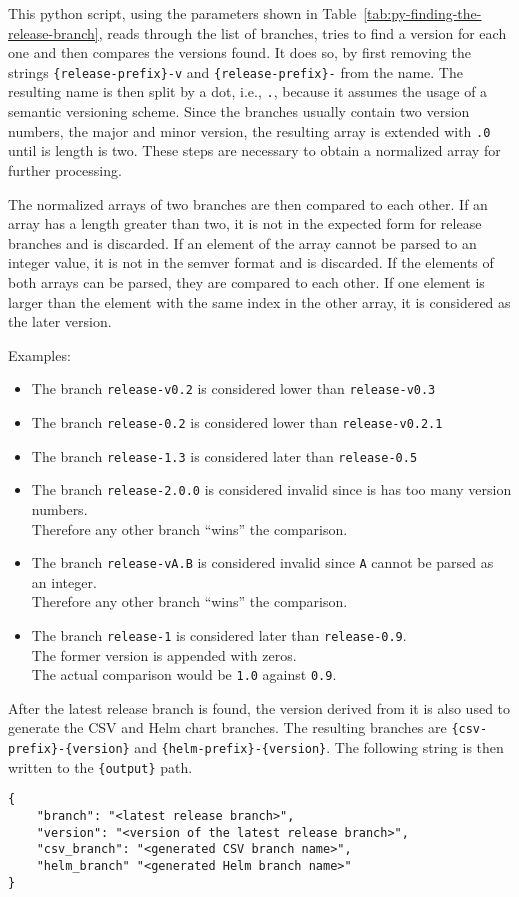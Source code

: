 This python script, using the parameters shown in Table~\ref{tab:py-finding-the-release-branch}, reads through the list of branches, tries to find a version for each one and then compares the versions found.
It does so, by first removing the strings \verb|{release-prefix}-v| and \verb|{release-prefix}-| from the name.
The resulting name is then split by a dot, i.e., \verb|.|, because it assumes the usage of a semantic versioning scheme.
Since the branches usually contain two version numbers, the major and minor version, the resulting array is extended with \verb|.0| until is length is two.
These steps are necessary to obtain a normalized array for further processing.

The normalized arrays of two branches are then compared to each other.
If an array has a length greater than two, it is not in the expected form for release branches and is discarded.
If an element of the array cannot be parsed to an integer value, it is not in the semver format and is discarded.
If the elements of both arrays can be parsed, they are compared to each other.
If one element is larger than the element with the same index in the other array, it is considered as the later version.

Examples:
\begin{itemize}
    \item The branch \verb|release-v0.2| is considered lower than \verb|release-v0.3|
    \item The branch \verb|release-0.2|  is considered lower than \verb|release-v0.2.1|
    \item The branch \verb|release-1.3| is considered later than \verb|release-0.5|
    \item The branch \verb|release-2.0.0| is considered invalid since is has too many version numbers. \\ Therefore any other branch ``wins'' the comparison.
    \item The branch \verb|release-vA.B| is considered invalid since \verb|A| cannot be parsed as an integer. \\ Therefore any other branch ``wins'' the comparison.
    \item The branch \verb|release-1| is considered later than \verb|release-0.9|. \\ The former version is appended with zeros. \\ The actual comparison would be \verb|1.0| against \verb|0.9|.
\end{itemize}

After the latest release branch is found, the version derived from it is also used to generate the CSV and Helm chart branches.
The resulting branches are \verb`{csv-prefix}-{version}` and \verb`{helm-prefix}-{version}`.
The following string is then written to the \verb`{output}` path.

\begin{verbatim}
{
    "branch": "<latest release branch>",
    "version": "<version of the latest release branch>",
    "csv_branch": "<generated CSV branch name>",
    "helm_branch" "<generated Helm branch name>"
}
\end{verbatim}

